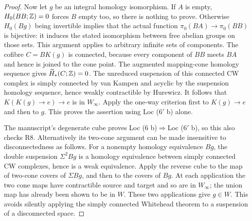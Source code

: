 \begin{proof}
Now let $g$ be an integral homology isomorphism. If $A$ is empty, $H_0(BB;\mathbb Z)=0$ forces $B$ empty too, so there is nothing to prove. Otherwise $H_0(Bg)$ being invertible implies that the actual function $\pi_0(BA)\to\pi_0(BB)$ is bijective: it induces the stated isomorphism between free abelian groups on those sets. This argument applies to arbitrary infinite sets of components. The cofibre $C=BK(g)$ is connected, because every component of $BB$ meets $BA$ and hence is joined to the cone point. The augmented mapping-cone homology sequence gives $\widetilde H_*(C;\mathbb Z)=0$. The unreduced suspension of this connected CW complex is simply connected by van Kampen and acyclic by the suspension homology sequence, hence weakly contractible by Hurewicz. It follows that $K(K(g)\to e)\to e$ is in $W_\infty$. Apply the one-way criterion first to $K(g)\to e$ and then to $g$. This proves the assertion using Loc ($6'$ b) alone.

The manuscript's degenerate cube proves Loc (6 b)$\Rightarrow$Loc ($6'$ b), so this also checks R8. Alternatively its two-cone argument can be made insensitive to disconnectedness as follows. For a nonempty homology equivalence $Bg$, the double suspension $\Sigma^2Bg$ is a homology equivalence between simply connected CW complexes, hence is a weak equivalence. Apply the reverse cube to the map of two-cone covers of $\Sigma Bg$, and then to the covers of $Bg$. At each application the two cone maps have contractible source and target and so are in $W_\infty$; the union map has already been shown to be in $W$. These two applications give $g\in W$. This avoids silently applying the simply connected Whitehead theorem to a suspension of a disconnected space.
\end{proof}
